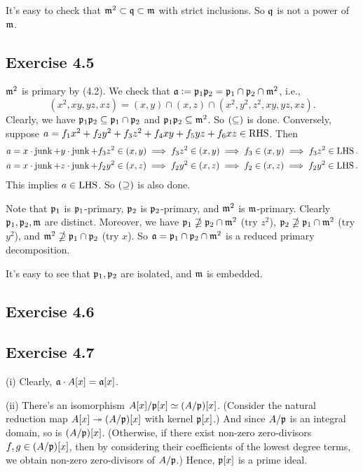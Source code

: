 \documentclass[../A&M.tex]{subfiles}
\begin{document}
It's easy to check that $\mathfrak{m}^2 \subset \mathfrak{q} \subset \mathfrak{m}$ with strict inclusions. So $\mathfrak{q}$ is not a power of $\mathfrak{m}$.

\subsection*{Exercise 4.5}

$\mathfrak{m}^2$ is primary by (4.2). We check that $\mathfrak{a} := \mathfrak{p}_1\mathfrak{p}_2 = \mathfrak{p}_1 \cap \mathfrak{p}_2 \cap \mathfrak{m}^2$, i.e.,
$$
(x^2,xy,yz,xz) = (x,y) \cap (x,z) \cap (x^2,y^2,z^2,xy,yz,xz).
$$
Clearly, we have $\mathfrak{p}_1\mathfrak{p}_2 \subseteq \mathfrak{p}_1 \cap \mathfrak{p}_2$ and $\mathfrak{p}_1\mathfrak{p}_2 \subseteq \mathfrak{m}^2$. So $(\subseteq)$ is done. Conversely, suppose $a=f_1x^2+f_2y^2+f_3z^2+f_4xy+f_5yz+f_6xz \in \operatorname{RHS}$. Then
\begin{align*}
a &= x \cdot \operatorname{junk} + y \cdot \operatorname{junk} + f_3z^2 \in (x,y) \implies f_3z^2 \in (x,y) \implies f_3 \in (x,y) \implies f_3z^2 \in \operatorname{LHS}. \\
a &= x \cdot \operatorname{junk} + z \cdot \operatorname{junk} + f_2y^2 \in (x,z) \implies f_2y^2 \in (x,z) \implies f_2 \in (x,z) \implies f_2y^2 \in \operatorname{LHS}.
\end{align*}
This implies $a\in\operatorname{LHS}$. So $(\supseteq)$ is also done.

Note that $\mathfrak{p}_1$ is $\mathfrak{p}_1$-primary, $\mathfrak{p}_2$ is $\mathfrak{p}_2$-primary, and $\mathfrak{m}^2$ is $\mathfrak{m}$-primary. Clearly $\mathfrak{p}_1,\mathfrak{p}_2,\mathfrak{m}$ are distinct. Moreover, we have $\mathfrak{p}_1 \nsupseteq \mathfrak{p}_2 \cap \mathfrak{m}^2$ (try $z^2$), $\mathfrak{p}_2 \nsupseteq \mathfrak{p}_1 \cap \mathfrak{m}^2$ (try $y^2$), and $\mathfrak{m}^2 \nsupseteq \mathfrak{p}_1 \cap \mathfrak{p}_2$ (try $x$). So $\mathfrak{a} = \mathfrak{p}_1 \cap \mathfrak{p}_2 \cap \mathfrak{m}^2$ is a reduced primary decomposition.

It's easy to see that $\mathfrak{p}_1,\mathfrak{p}_2$ are isolated, and $\mathfrak{m}$ is embedded.

\subsection*{Exercise 4.6}

\subsection*{Exercise 4.7}

(i) Clearly, $\mathfrak{a} \cdot A[x] = \mathfrak{a}[x]$.

(ii) There's an isomorphism $A[x]/\mathfrak{p}[x] \simeq (A/\mathfrak{p})[x]$. (Consider the natural reduction map $A[x] \twoheadrightarrow (A/\mathfrak{p})[x]$ with kernel $\mathfrak{p}[x]$.) And since $A/\mathfrak{p}$ is an integral domain, so is $ (A/\mathfrak{p})[x]$. (Otherwise, if there exist non-zero zero-divisors $f,g \in (A/\mathfrak{p})[x]$, then by considering their coefficients of the lowest degree terms, we obtain non-zero zero-divisors of $A/\mathfrak{p}$.) Hence, $\mathfrak{p}[x]$ is a prime ideal. 
\end{document}
